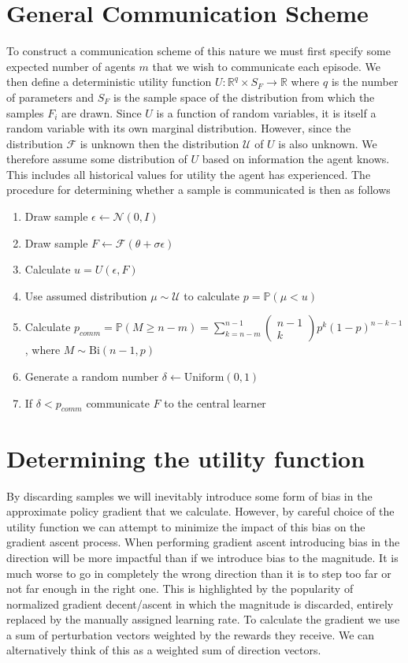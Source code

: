 \section{General Communication Scheme}
\label{sec:GeneralScheme}
To construct a communication scheme of this nature we must first specify some expected number of agents $m$ that we wish to communicate each episode.
We then define a deterministic utility function $U: \mathbb{R}^{q} \times S_F \rightarrow \mathbb{R}$ where $q$ is the number of parameters and $S_F$ is the sample space of the distribution from which the samples $F_i$ are drawn.
Since $U$ is a function of random variables, it is itself a random variable with its own marginal distribution. 
However, since the distribution $\mathcal{F}$ is unknown then the distribution $\mathcal{U}$ of $U$ is also unknown. 
We therefore assume some distribution of $U$ based on information the agent knows. 
This includes all historical values for utility the agent has experienced.
The procedure for determining whether a sample is communicated is then as follows
\begin{enumerate}
    \item Draw sample $\epsilon \leftarrow \mathcal{N}(0,I)$
    \item Draw sample $F \leftarrow \mathcal{F}(\theta + \sigma \epsilon)$
    \item Calculate $u = U(\epsilon,F)$
    \item Use assumed distribution $\mu \sim \mathcal{U}$ to calculate $p=\mathbb{P}(\mu < u)$
    \item Calculate $p_{comm}=\mathbb{P}(M \geq n-m) = \sum_{k=n-m}^{n-1} \begin{pmatrix}n-1 \\ k\end{pmatrix}p^k(1-p)^{n-k-1}$, where $M \sim \text{Bi}(n-1,p)$
    \item Generate a random number $\delta \leftarrow \text{Uniform}(0,1)$
    \item If $\delta<p_{comm}$ communicate $F$ to the central learner
\end{enumerate}

\section{Determining the utility function}
\label{sec:Utility}
By discarding samples we will inevitably introduce some form of bias in the approximate policy gradient that we calculate. 
However, by careful choice of the utility function we can attempt to minimize the impact of this bias on the gradient ascent process.
When performing gradient ascent introducing bias in the direction will be more impactful than if we introduce bias to the magnitude. 
It is much worse to go in completely the wrong direction than it is to step too far or not far enough in the right one. 
This is highlighted by the popularity of normalized gradient decent/ascent \cite{NGD} in which the magnitude is discarded, entirely replaced by the manually assigned learning rate.
To calculate the gradient we use a sum of perturbation vectors weighted by the rewards they receive. We can alternatively think of this as a weighted sum of direction vectors.

